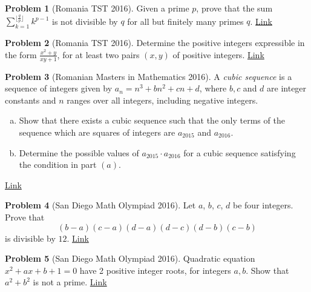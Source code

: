 \documentclass[]{article}
\theoremstyle{definition}
\newtheorem{problem}{Problem}
\begin{document}
\begin{problem}[Romania TST 2016]
	Given a prime $p$, prove that the sum $\sum\limits_{k=1}^{\lfloor \frac{q}{p} \rfloor}{k^{p-1}}$ is not divisible by $q$ for all but finitely many primes $q$. \hfill \href{http://artofproblemsolving.com/community/c6h1251136p6445449}{Link}
\end{problem}



\begin{problem}[Romania TST 2016]
	Determine the positive integers expressible in the form $\frac{x^2+y}{xy+1}$, for at least two pairs $(x,y)$ of positive integers. \hfill \href{http://artofproblemsolving.com/community/c6h1251122p6445252}{Link}
\end{problem}




\begin{problem}[Romanian Masters in Mathematics 2016]
	A \textit{cubic sequence} is a sequence of integers given by $a_n =n^3 + bn^2 + cn + d$, where $b, c$ and $d$ are integer constants and $n$ ranges over all integers, including negative integers.
		\begin{enumerate}[(a)]
			\item Show that there exists a cubic sequence such that the only terms
			of the sequence which are squares of integers are $a_{2015}$ and $a_{2016}$.
			\item Determine the possible values of $a_{2015} \cdot a_{2016}$ for a cubic sequence
		satisfying the condition in part $(a)$.
		\end{enumerate}
	\flushright \href{http://artofproblemsolving.com/community/c6h1204358p5938852}{Link}
\end{problem}



\begin{problem}[San Diego Math Olympiad 2016]
	Let $a$, $b$, $c$, $d$ be four integers. Prove that $$\left(b-a\right)\left(c-a\right)\left(d-a\right)\left(d-c\right)\left(d-b\right)\left(c-b\right)$$is divisible by $12$. \hfill \href{http://artofproblemsolving.com/community/c6h1217917p6073408}{Link}
\end{problem}



\begin{problem}[San Diego Math Olympiad 2016]
	Quadratic equation $ x^2+ax+b+1=0$ have 2 positive integer roots, for integers $ a,b$. Show that $ a^2+b^2$ is not a prime. \hfill \href{http://artofproblemsolving.com/community/c6h307428p1660713}{Link}
\end{problem}
\end{document}
